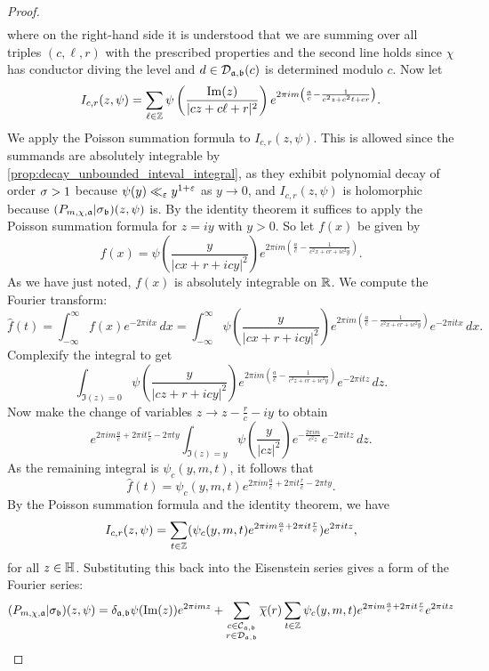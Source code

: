 \begin{proof}
\begin{align*}
      \end{align*}
     where on the right-hand side it is understood that we are summing over all triples $(c,\ell,r)$ with the prescribed properties and the second line holds since $\chi$ has conductor diving the level and $d \in \mathcal{D}_{\mathfrak{a},\mathfrak{b}}(c)$ is determined modulo $c$. Now let
      \[
        I_{c,r}(z,\psi) = \sum_{\ell \in \mathbb{Z}}\psi\left(\frac{\mathrm{Im}(z)}{|cz+c\ell+r|^{2}}\right)e^{2\pi im\left(\frac{a}{c}-\frac{1}{c^{2}z+c^{2}\ell+cr}\right)}.
      \]
      We apply the Poisson summation formula to $I_{c,r}(z,\psi)$. This is allowed since the summands are absolutely integrable by \cref{prop:decay_unbounded_inteval_integral}, as they exhibit polynomial decay of order $\sigma > 1$ because $\psi(y) \ll_{\varepsilon} y^{1+\varepsilon}$ as $y \to 0$, and $I_{c,r}(z,\psi)$ is holomorphic because $(P_{m,\chi,\mathfrak{a}}|\sigma_{\mathfrak{b}})(z,\psi)$ is. By the identity theorem it suffices to apply the Poisson summation formula for $z = iy$ with $y > 0$. So let $f(x)$ be given by
      \[
        f(x) = \psi\left(\frac{y}{|cx+r+icy|^{2}}\right)e^{2\pi im\left(\frac{a}{c}-\frac{1}{c^{2}x+cr+ic^{2}y}\right)}.
      \]
      As we have just noted, $f(x)$ is absolutely integrable on $\mathbb{R}$. We compute the Fourier transform:
      \[
        \hat{f}(t) = \int_{-\infty}^{\infty}f(x)e^{-2\pi itx}\,dx = \int_{-\infty}^{\infty}\psi\left(\frac{y}{|cx+r+icy|^{2}}\right)e^{2\pi im\left(\frac{a}{c}-\frac{1}{c^{2}x+cr+ic^{2}y}\right)}e^{-2\pi itx}\,dx.
      \]
      Complexify the integral to get
      \[
        \int_{\Im(z) = 0}\psi\left(\frac{y}{|cz+r+icy|^{2}}\right)e^{2\pi im\left(\frac{a}{c}-\frac{1}{c^{2}z+cr+ic^{2}y}\right)}e^{-2\pi itz}\,dz.
      \]
      Now make the change of variables $z \to z-\frac{r}{c}-iy$ to obtain
      \[
        e^{2\pi im\frac{a}{c}+2\pi it\frac{r}{c}-2\pi ty}\int_{\Im(z) = y}\psi\left(\frac{y}{|cz|^{2}}\right)e^{-\frac{2\pi im}{c^{2}z}}e^{-2\pi itz}\,dz.
      \]
      As the remaining integral is $\psi_{c}(y,m,t)$, it follows that
      \[
        \hat{f}(t) = \psi_{c}(y,m,t)e^{2\pi im\frac{a}{c}+2\pi it\frac{r}{c}-2\pi ty}.
      \]
      By the Poisson summation formula and the identity theorem, we have
      \[
        I_{c,r}(z,\psi) = \sum_{t \in \mathbb{Z}}(\psi_{c}(y,m,t)e^{2\pi im\frac{a}{c}+2\pi it\frac{r}{c}})e^{2\pi itz},
      \]
      for all $z \in \mathbb{H}$. Substituting this back into the Eisenstein series gives a form of the Fourier series:
      \begin{align*}
        (P_{m,\chi,\mf{a}}|\s_{\mf{b}})(z,\psi) &= \d_{\mf{a},\mf{{b}}}\psi(\Im(z))e^{2\pi imz}+\sum_{\substack{c \in \mc{C}_{\mf{a},\mf{b}} \\ r \in \mc{D}_{\mf{a},\mf{b}}}}\cchi(r)\sum_{t \in \Z}\psi_{c}(y,m,t)e^{2\pi im\frac{a}{c}+2\pi it\frac{r}{c}}e^{2\pi itz} \\

\end{align*}
\end{proof}
